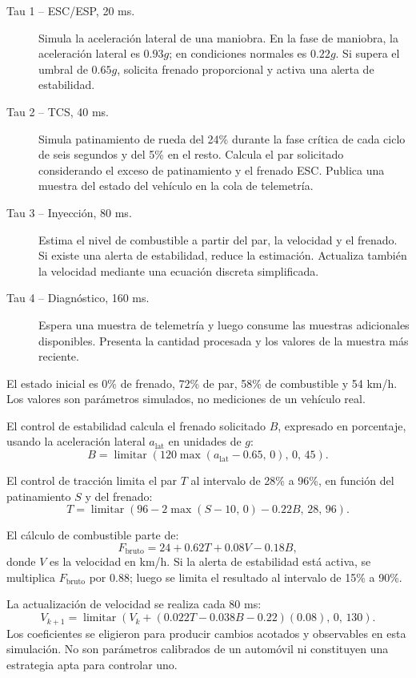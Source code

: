 \documentclass[12pt,a4paper]{article}
\begin{document}
\begin{description}
  \item[Tau 1 -- ESC/ESP, 20 ms.] Simula la aceleración lateral de una maniobra. En la fase de maniobra, la aceleración lateral es \(0.93g\); en condiciones normales es \(0.22g\). Si supera el umbral de \(0.65g\), solicita frenado proporcional y activa una alerta de estabilidad.
  \item[Tau 2 -- TCS, 40 ms.] Simula patinamiento de rueda del 24\% durante la fase crítica de cada ciclo de seis segundos y del 5\% en el resto. Calcula el par solicitado considerando el exceso de patinamiento y el frenado ESC. Publica una muestra del estado del vehículo en la cola de telemetría.
  \item[Tau 3 -- Inyección, 80 ms.] Estima el nivel de combustible a partir del par, la velocidad y el frenado. Si existe una alerta de estabilidad, reduce la estimación. Actualiza también la velocidad mediante una ecuación discreta simplificada.
  \item[Tau 4 -- Diagnóstico, 160 ms.] Espera una muestra de telemetría y luego consume las muestras adicionales disponibles. Presenta la cantidad procesada y los valores de la muestra más reciente.
\end{description}

El estado inicial es 0\% de frenado, 72\% de par, 58\% de combustible y 54 km/h. Los valores son parámetros simulados, no mediciones de un vehículo real.

El control de estabilidad calcula el frenado solicitado \(B\), expresado en porcentaje, usando la aceleración lateral \(a_{\mathrm{lat}}\) en unidades de \(g\):
\[
 B = \operatorname{limitar}\left(
 120\max(a_{\mathrm{lat}}-0.65,\,0),\,0,\,45
 \right).
\]

El control de tracción limita el par \(T\) al intervalo de 28\% a 96\%, en función del patinamiento \(S\) y del frenado:
\[
 T = \operatorname{limitar}\left(
 96-2\max(S-10,\,0)-0.22B,\,28,\,96
 \right).
\]

El cálculo de combustible parte de:
\[
 F_{\mathrm{bruto}} = 24+0.62T+0.08V-0.18B,
\]
donde \(V\) es la velocidad en km/h. Si la alerta de estabilidad está activa, se multiplica \(F_{\mathrm{bruto}}\) por \(0.88\); luego se limita el resultado al intervalo de 15\% a 90\%.

La actualización de velocidad se realiza cada \(80\) ms:
\[
 V_{k+1} = \operatorname{limitar}\left(
 V_k+(0.022T-0.038B-0.22)(0.08),\,0,\,130
 \right).
\]
Los coeficientes se eligieron para producir cambios acotados y observables en esta simulación. No son parámetros calibrados de un automóvil ni constituyen una estrategia apta para controlar uno.
\end{document}
